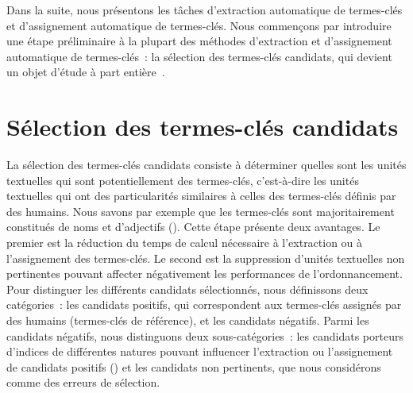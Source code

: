     Dans la suite, nous présentons les tâches d'extraction automatique de
    termes-clés et d'assignement automatique de termes-clés. Nous commençons par
    introduire une étape préliminaire à la plupart des méthodes d'extraction et
    d'assignement automatique de termes-clés~: la sélection des termes-clés
    candidats, qui devient un objet d'étude à part
    entière~\cite{wang2014keyphraseextractionpreprocessing}.


  \section{Sélection des termes-clés candidats}
  \label{sec:main-state_of_the_art-keyphrase_candidate_selection}
    La sélection des termes-clés candidats consiste à déterminer quelles sont
    les unités textuelles qui sont potentiellement des termes-clés, c'est-à-dire
    les unités textuelles qui ont des particularités similaires à celles des
    termes-clés définis par des humains. Nous savons par exemple que les
    termes-clés sont majoritairement constitués de noms et d'adjectifs
    (). Cette étape présente deux avantages. Le premier est la
    réduction du temps de calcul nécessaire à l'extraction ou à l'assignement
    des termes-clés. Le second est la suppression d'unités textuelles non
    pertinentes pouvant affecter négativement les performances de
    l'ordonnancement. Pour distinguer les différents candidats sélectionnés,
    nous définissons deux catégories~: les candidats positifs, qui
    correspondent aux termes-clés assignés par des humains (termes-clés de
    référence), et les candidats négatifs. Parmi les candidats négatifs,
    nous distinguons deux sous-catégories~: les candidats porteurs
    d'indices de différentes natures pouvant influencer
    l'extraction ou l'assignement de candidats positifs () et les
    candidats non pertinents, que nous considérons comme des
    erreurs de sélection.

